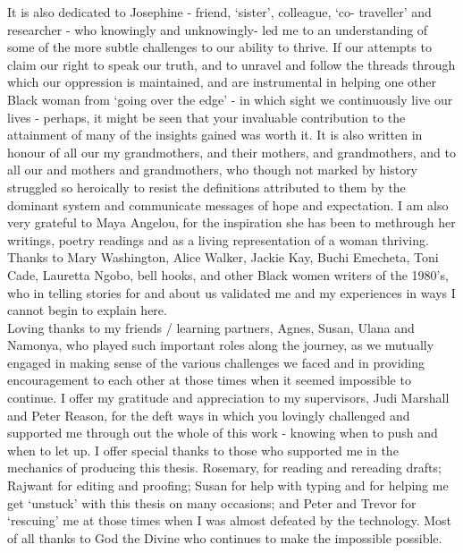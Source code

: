 \documentclass[
11pt, 
english,
singlespacing,
headsepline,
]{MastersDoctoralThesis}
\begin{document}
\begin{acknowledgements}
It is also dedicated to Josephine - friend, ‘sister’, colleague, ‘co- traveller’ and
researcher - who knowingly and unknowingly- led me to an understanding of some of
the more subtle challenges to our ability to thrive. If our attempts to claim our right to
speak our truth, and to unravel and follow the threads through which our oppression is
maintained, and are instrumental in helping one other Black woman from ‘going over
the edge’ - in which sight we continuously live our lives - perhaps, it might be seen
that your invaluable contribution to the attainment of many of the insights gained was
worth it. It is also written in honour of all our my grandmothers, and their mothers,
and grandmothers, and to all our and mothers and grandmothers, who though not
marked by history struggled so heroically to resist the definitions attributed to them
by the dominant system and communicate messages of hope and expectation.
I am also very grateful to Maya Angelou, for the inspiration she has been to methrough her writings, poetry readings and as a living representation of a woman
thriving. Thanks to Mary Washington, Alice Walker, Jackie Kay, Buchi Emecheta,
Toni Cade, Lauretta Ngobo, bell hooks, and other Black women writers of the 1980’s,
who in telling stories for and about us validated me and my experiences in ways I
cannot begin to explain here.\\

Loving thanks to my friends / learning partners, Agnes, Susan, Ulana and Namonya,
who played such important roles along the journey, as we mutually engaged in
making sense of the various challenges we faced and in providing encouragement to
each other at those times when it seemed impossible to continue. I offer my gratitude
and appreciation to my supervisors, Judi Marshall and Peter Reason, for the deft ways
in which you lovingly challenged and supported me through out the whole of this
work - knowing when to push and when to let up. I offer special thanks to those who
supported me in the mechanics of producing this thesis. Rosemary, for reading and rereading drafts; Rajwant for editing and proofing; Susan for help with typing and for
helping me get ‘unstuck’ with this thesis on many occasions; and Peter and Trevor for
‘rescuing’ me at those times when I was almost defeated by the technology. Most of
all thanks to God the Divine who continues to make the impossible possible.

\end{acknowledgements}

\end{document}
